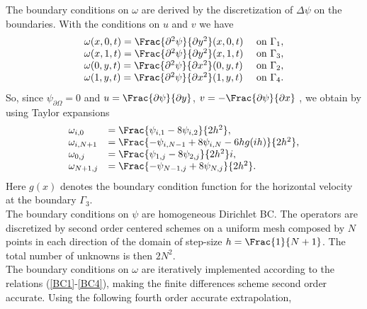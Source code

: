{The boundary conditions on $\omega$ are derived by the
discretization of $\Delta \psi$ on the boundaries. With the
conditions on $u$ and $v$ we have
$$
\begin{array}{ll}
\omega(x,0,t) = \Frac {\partial^2 \psi}{\partial y^2}(x,0,t) &
\mbox{ on } \Gamma_1,\\
\omega(x,1,t) = \Frac {\partial^2 \psi}{\partial y^2}(x,1,t) &
\mbox{ on } \Gamma_3,\\
\omega(0,y,t) = \Frac {\partial^2 \psi}{\partial x^2}(0,y,t) &
\mbox{ on } \Gamma_2,\\
\omega(1,y,t) = \Frac {\partial^2 \psi}{\partial x^2}(1,y,t) &
\mbox{ on } \Gamma_4.
\end{array}
$$
So, since $\psi_{\partial \Omega}=0$ and $u=\Frac {\partial
\psi}{\partial y}$, $v=-\Frac {\partial \psi}{\partial x}$ , we
obtain by using Taylor expansions
\begin{eqnarray}
\begin{array}{ll}
\omega_{i,0} &=
\Frac { \psi_{i,1}-8\psi_{i,2}}{2h^2}\label{BC1},\\
\omega_{i,N+1} &= \Frac {- \psi_{i,N-1}+8\psi_{i,N} -6h
g(ih)}{2h^2}\label{BC2},\\
\omega_{0,j} &=
\Frac {\psi_{1,j}-8\psi_{2,j}}{2h^2}i\label{BC3},\\
\omega_{N+1,j} &= \Frac {-
\psi_{N-1,j}+8\psi_{N,j}}{2h^2}\label{BC4}.
\end{array}
\end{eqnarray}
Here $g(x)$ denotes the boundary condition function for the
horizontal velocity
at the boundary $\Gamma_3$.\\
The boundary conditions on $\psi$ are homogeneous Dirichlet BC. The
operators are discretized by second order centered schemes on a
uniform mesh composed by $N$ points in each direction of the domain
of step-size
$h=\Frac{1}{N+1}$. The total number of unknowns is then $2 N^2$.\\
The boundary conditions on $\omega$ are iteratively implemented
according to the relations (\ref{BC1}-\ref{BC4}), making the finite
differences scheme second order accurate. Using the following fourth order accurate extrapolation,

}
